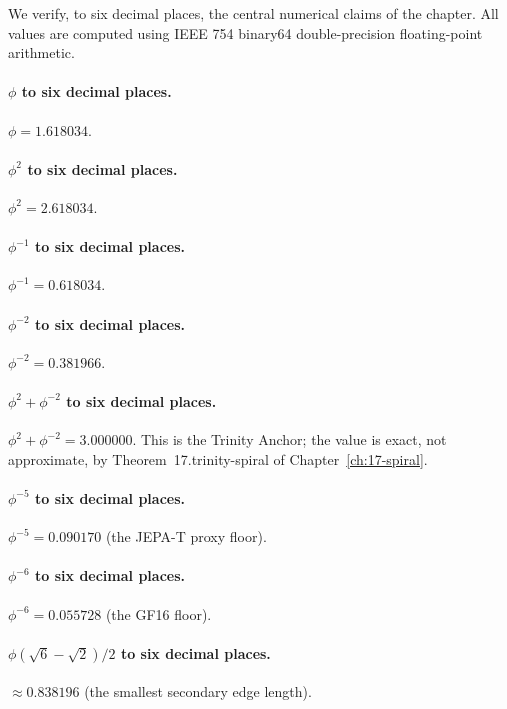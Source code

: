 We verify, to six decimal places, the central numerical claims of
the chapter. All values are computed using IEEE 754 binary64
double-precision floating-point arithmetic.

\paragraph{$\phi$ to six decimal places.}
$\phi = 1.618034$.

\paragraph{$\phi^{2}$ to six decimal places.}
$\phi^{2} = 2.618034$.

\paragraph{$\phi^{-1}$ to six decimal places.}
$\phi^{-1} = 0.618034$.

\paragraph{$\phi^{-2}$ to six decimal places.}
$\phi^{-2} = 0.381966$.

\paragraph{$\phi^{2} + \phi^{-2}$ to six decimal places.}
$\phi^{2} + \phi^{-2} = 3.000000$. This is the Trinity Anchor;
the value is exact, not approximate, by
Theorem~17.trinity-spiral of Chapter~\ref{ch:17-spiral}.

\paragraph{$\phi^{-5}$ to six decimal places.}
$\phi^{-5} = 0.090170$ (the JEPA-T proxy floor).

\paragraph{$\phi^{-6}$ to six decimal places.}
$\phi^{-6} = 0.055728$ (the GF16 floor).

\paragraph{$\phi(\sqrt{6} - \sqrt{2})/2$ to six decimal places.}
$\approx 0.838196$ (the smallest secondary edge length).

